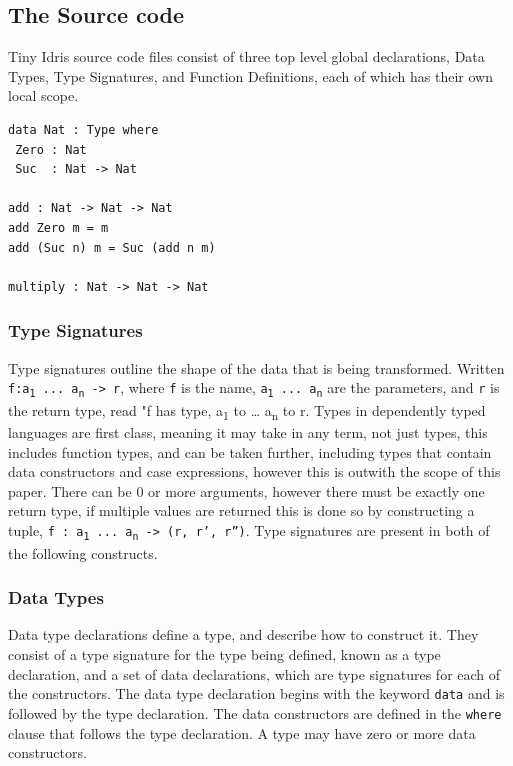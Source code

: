 \documentclass[a4paper]{article}
\begin{document}
\subsection{The Source code}
\label{sec:org85decd2}
Tiny Idris source code files consist of three top level global 
declarations, Data Types, Type Signatures, and Function Definitions,
each of which has their own local scope. 

\begin{center}
\begin{verbatim}
data Nat : Type where
 Zero : Nat
 Suc  : Nat -> Nat

add : Nat -> Nat -> Nat
add Zero m = m
add (Suc n) m = Suc (add n m) 

multiply : Nat -> Nat -> Nat
\end{verbatim}
\end{center}

\subsubsection{Type Signatures}
\label{sec:org6cd40f9}
Type signatures outline the shape of the data that is being transformed.
Written \texttt{f:a\textsubscript{1} ... a\textsubscript{n} -> r}, where \texttt{f} is the name, \texttt{a\textsubscript{1} ...  a\textsubscript{n}} are
the parameters, and \texttt{r} is the return type, read "f has type, a\textsubscript{1} 
to \ldots{} a\textsubscript{n} to r. Types in dependently typed languages are first class,
meaning it may take in any term, not just types, this includes function
types, and can be taken further, including types that contain data constructors and case expressions, however this is outwith the scope of
this paper. There can be 0 or more arguments,
however there must be exactly one return type, if multiple values are 
returned this is done so by constructing a tuple,
\texttt{f : a\textsubscript{1} ... a\textsubscript{n} -> (r, r', r'')}. Type signatures are present in both
of the following constructs.

\subsubsection{Data Types}
\label{sec:orga233947}
Data type declarations define a type, and describe how to construct it.
They consist of a type signature for the type being 
defined, known as a type declaration, and a set of data declarations, 
which are type signatures for each of the constructors.
The data type declaration begins with the keyword \texttt{data} and is followed by 
the type declaration. The data constructors are defined in the \texttt{where} 
clause that follows the type declaration. A type may have zero or more
data constructors. 
\end{document}
